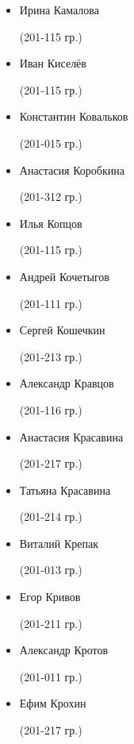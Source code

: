 \begin{multicols}{2}
\begin{small}
\begin{itemize}[leftmargin=*]
	\item[] Ирина Камалова\begin{tiny} (201-115 гр.)\end{tiny}
	\item[] Иван Киселёв\begin{tiny} (201-115 гр.)\end{tiny}
	\item[] Константин Ковальков\begin{tiny} (201-015 гр.)\end{tiny}
	\item[] Анастасия Коробкина\begin{tiny} (201-312 гр.)\end{tiny} %
	\item[] Илья Копцов\begin{tiny} (201-115 гр.)\end{tiny} %
	\item[] Андрей Кочетыгов\begin{tiny} (201-111 гр.)\end{tiny} %
	\item[] Сергей Кошечкин\begin{tiny} (201-213 гр.)\end{tiny}
	\item[] Александр Кравцов\begin{tiny} (201-116 гр.)\end{tiny}
	\item[] Анастасия Красавина\begin{tiny} (201-217 гр.)\end{tiny} %
	\item[] Татьяна Красавина\begin{tiny} (201-214 гр.)\end{tiny} %
	\item[] Виталий Крепак\begin{tiny} (201-013 гр.)\end{tiny}
	\item[] Егор Кривов\begin{tiny} (201-211 гр.)\end{tiny}
	\item[] Александр Кротов\begin{tiny} (201-011 гр.)\end{tiny}
	\item[] Ефим Крохин\begin{tiny} (201-217 гр.)\end{tiny} %

\end{itemize}
\end{small}
\end{multicols}
